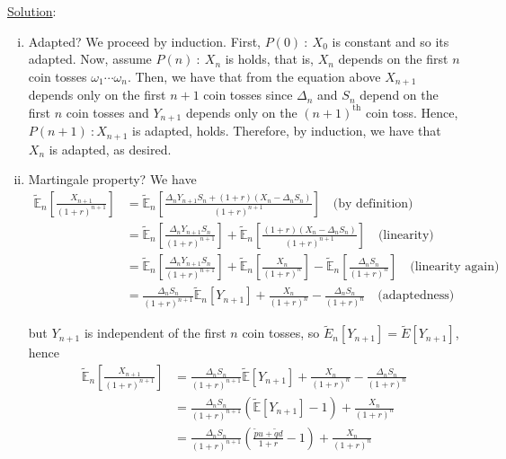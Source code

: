 \documentclass[12pt]{article}
\newcommand{\E}{\mathbb E}
\begin{document}
\underline{Solution}: 
\begin{enumerate}[(i)]
	\item Adapted? We proceed by induction. First, $P(0)~:~X_0$ is constant and so its adapted. Now, assume $P(n)~:~X_n$ is holds, that is, $X_n$ depends on the first $n$ coin tosses $\omega_1\cdots\omega_n$. Then, we have that from the equation above $X_{n + 1}$ depends only on the first $n + 1$ coin tosses since $\Delta_n$ and $S_n$ depend on the first $n$ coin tosses and $Y_{n + 1}$ depends only on the $(n + 1)^\text{th}$ coin toss. Hence, $P(n + 1)~:X_{n + 1}$ is adapted, holds. Therefore, by induction, we have that $X_n$ is adapted, as desired.
	\item Martingale property? We have
	\begin{align*}
		\tilde{\E}_n \left[ \frac{X_{n + 1}}{(1 + r)^{n + 1}} \right] &= \tilde{\E}_n \left[ \frac{\Delta_nY_{n + 1}S_n + (1 + r)(X_n - \Delta_nS_n)}{(1 + r)^{n + 1}} \right] \quad \text{(by definition)} \\
		&= \tilde{\E}_n \left[ \frac{\Delta_nY_{n + 1}S_n}{(1 + r)^{n + 1}} \right] + \tilde{\E}_n \left[ \frac{(1 + r)(X_n - \Delta_nS_n)}{(1 + r)^{n + 1}} \right] \quad \text{(linearity)} \\
		&= \tilde{\E}_n \left[ \frac{\Delta_nY_{n + 1}S_n}{(1 + r)^{n + 1}} \right] + \tilde{\E}_n \left[ \frac{X_n}{(1 + r)^n} \right] - \tilde{\E}_n \left[ \frac{ \Delta_nS_n }{(1 + r)^n} \right] \quad \text{(linearity again)} \\
		&= \frac{\Delta_nS_n}{(1 + r)^{n + 1}} \tilde{\E}_n \left[ Y_{n + 1} \right] + \frac{X_n}{(1 + r)^n} - \frac{ \Delta_nS_n }{(1 + r)^n} \quad \text{(adaptedness)}
	\end{align*}
	
	but $Y_{n + 1}$ is independent of the first $n$ coin tosses, so $\tilde{E}_n [Y_{n + 1}] = \tilde{E} [Y_{n + 1}]$, hence
	\begin{align*}
		\tilde{\E}_n \left[ \frac{X_{n + 1}}{(1 + r)^{n + 1}} \right] &= \frac{\Delta_nS_n}{(1 + r)^{n + 1}} \tilde{\E} \left[ Y_{n + 1} \right] + \frac{X_n}{(1 + r)^n} - \frac{ \Delta_nS_n }{(1 + r)^n} \\
		&= \frac{\Delta_nS_n}{(1 + r)^{n + 1}} \left( \tilde{\E} \left[ Y_{n + 1} \right] - 1 \right) + \frac{X_n}{(1 + r)^n} \\
		&= \frac{\Delta_nS_n}{(1 + r)^{n + 1}} \left( \frac{\tilde{p}u + \tilde{q}d}{1 + r} - 1 \right) + \frac{X_n}{(1 + r)^n} \\
	\end{align*}
	

\end{enumerate}
\end{document}
